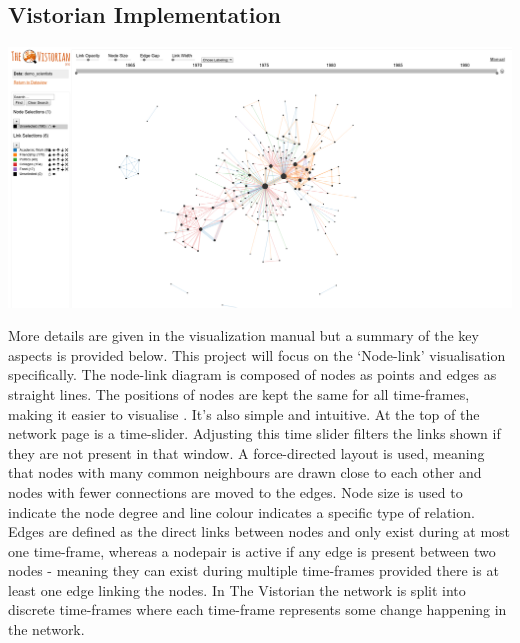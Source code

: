 \subsection{Vistorian Implementation}

\begin{center}
\includegraphics[trim={0 0 0 0}, width=140mm]{./Figures/vistorianOriginal.png}
\end{center}

More details are given in the visualization manual \cite{vismanual} but a summary of the key aspects is provided below.
This project will focus on the ‘Node-link’ visualisation specifically. The node-link diagram is composed of nodes as points and edges as straight lines. The positions of nodes are kept the same for all time-frames, making it easier to visualise \cite{tsotaivg}. It's also simple and intuitive.
At the top of the network page is a time-slider. Adjusting this time slider filters the links shown if they are not present in that window. A force-directed layout is used, meaning that nodes with many common neighbours are drawn close to each other and nodes with fewer connections are moved to the edges. Node size is used to indicate the node degree and line colour indicates a specific type of relation. Edges are defined as the direct links between nodes and only exist during at most one time-frame, whereas a nodepair is active if any edge is present between two nodes - meaning they can exist during multiple time-frames provided there is at least one edge linking the nodes. In The Vistorian the network is split into discrete time-frames where each time-frame represents some change happening in the network. 





